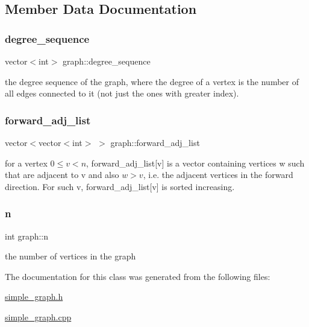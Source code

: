 \subsection{Member Data Documentation}
\mbox{\label{classgraph_a0b31295672bfe37669c9eb3640977fe6}} 
\subsubsection{\texorpdfstring{degree\+\_\+sequence}{degree\_sequence}}
{\footnotesize\ttfamily vector$<$int$>$ graph\+::degree\+\_\+sequence\hspace{0.3cm}{\ttfamily [private]}}



the degree sequence of the graph, where the degree of a vertex is the number of all edges connected to it (not just the ones with greater index). 

\mbox{\label{classgraph_a7d6441850d586d6a99fb73df57b70362}} 
\subsubsection{\texorpdfstring{forward\+\_\+adj\+\_\+list}{forward\_adj\_list}}
{\footnotesize\ttfamily vector$<$vector$<$int$>$ $>$ graph\+::forward\+\_\+adj\+\_\+list\hspace{0.3cm}{\ttfamily [private]}}



for a vertex $0 \leq v < n$, forward\+\_\+adj\+\_\+list\mbox{[}v\mbox{]} is a vector containing vertices w such that are adjacent to v and also $w > v$, i.\+e. the adjacent vertices in the forward direction. For such v, forward\+\_\+adj\+\_\+list\mbox{[}v\mbox{]} is sorted increasing. 

\mbox{\label{classgraph_ac8b3474ce95c04087c312508ec1443b6}} 
\subsubsection{\texorpdfstring{n}{n}}
{\footnotesize\ttfamily int graph\+::n\hspace{0.3cm}{\ttfamily [private]}}



the number of vertices in the graph 



The documentation for this class was generated from the following files\+:\begin{DoxyCompactItemize}
\item 
\hyperlink{simple__graph_8h}{simple\+\_\+graph.\+h}\item 
\hyperlink{simple__graph_8cpp}{simple\+\_\+graph.\+cpp}\end{DoxyCompactItemize}
